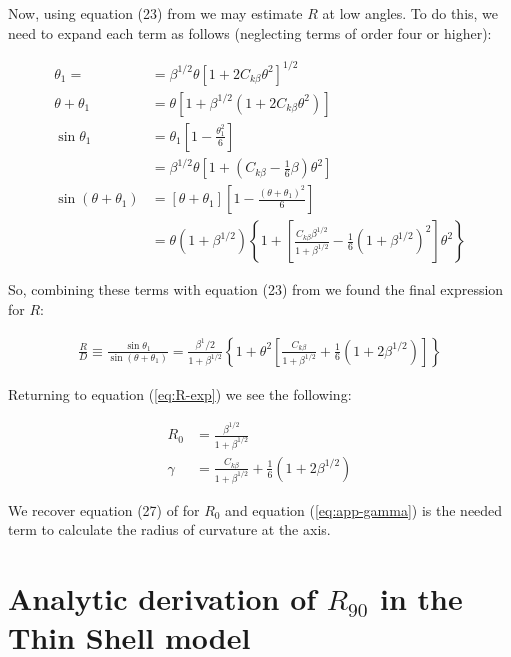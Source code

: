 Now, using equation (23) from \CRW{} we may estimate $R$ at low angles. To do this, we need to
expand each term as follows (neglecting terms of order four or higher):

\begin{align}
\theta_1 = &= \beta^{1/2}\theta\left[1+ 2C_{k\beta}\theta^2\right]^{1/2} \\
\theta + \theta_1 &= \theta\left[1+\beta^{1/2}\left(1+2C_{k\beta}\theta^2\right)\right]\\
\sin\theta_1 &= \theta_1\left[1-\frac{\theta_1^2}{6}\right] \\
 &= \beta^{1/2}\theta\left[1+\left(C_{k\beta}-\frac{1}{6}\beta\right)\theta^2\right] \\
 \sin(\theta+\theta_1) &= \left[\theta+\theta_1\right]\left[1-\frac{\left(\theta+\theta_1
 \right)^2}{6}\right] \\
 &= \theta\left(1+\beta^{1/2}\right)\left\lbrace 1+\left[\frac{C_{k\beta}\beta^{1/2}}
 {1+\beta^{1/2}}-\frac{1}{6}\left(1+\beta^{1/2}\right)^2\right]\theta^2\right\rbrace
\end{align}


So, combining these terms with equation (23) from \CRW{} we found the final expression for $R$:

\begin{align}
\frac{R}{D}\equiv \frac{\sin\theta_1}{\sin(\theta+\theta_1)} = \frac{\beta^1/2}{1+\beta^{1/2}}
\left\lbrace 1 + \theta^2\left[\frac{C_{k\beta}}{1+\beta^{1/2}}+\frac{1}{6}\left(1+2\beta^{1/2}
\right)\right] \right\rbrace \label{eq:r-small-theta}
\end{align}

Returning to equation (\ref{eq:R-exp}) we see the following:

\begin{align}
R_0 &= \frac{\beta^{1/2}}{1+\beta^{1/2}} \\
\gamma &= \frac{C_{k\beta}}{1+\beta^{1/2}}+\frac{1}{6}\left(1+2\beta^{1/2}\right)
\label{eq:app-gamma}
\end{align}

We recover equation (27) of \CRW{} for $R_0$ and equation (\ref{eq:app-gamma}) is the
needed term to calculate the radius of curvature at the axis.

\section{Analytic derivation of $R_{90}$ in the Thin Shell model}
\label{app:r90-analytic}

